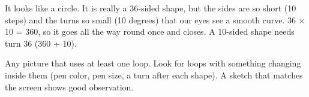 \begin{answer}
It looks like a circle. It is really a 36-sided shape, but the sides are so short (10 steps) and the turns so small (10 degrees) that our eyes see a smooth curve. 36 × 10 = 360, so it goes all the way round once and closes.
A 10-sided shape needs turn 36 (360 ÷ 10).
\end{answer}

\begin{answer}
Any picture that uses at least one loop. Look for loops with something changing inside them (pen color, pen size, a turn after each shape). A sketch that matches the screen shows good observation.
\end{answer}
